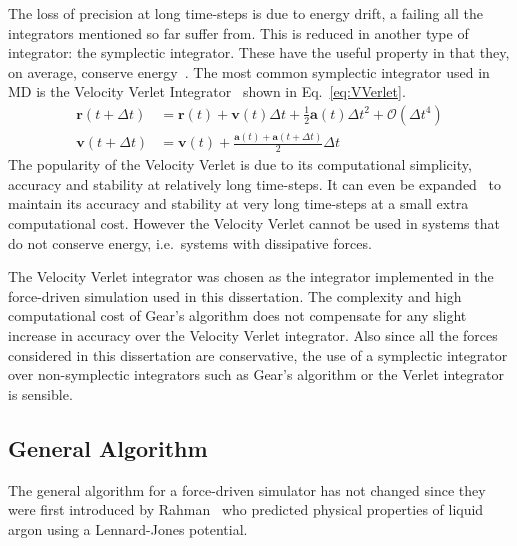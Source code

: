 \documentclass[12pt]{UoAthesis} \usepackage{booktabs}
\begin{document}
The loss of precision at long time-steps is due to energy drift, a
failing all the integrators mentioned so far suffer from.  This is
reduced in another type of integrator: the symplectic integrator.
These have the useful property in that they, on average, conserve
energy~\cite{Hairer2003}. The most common symplectic integrator used
in MD is the Velocity Verlet Integrator~\cite{Swope1982} shown in
Eq.~\eqref{eq:VVerlet}.
\begin{subequations}
\label{eq:VVerlet}
\begin{align}
 \mathbf{r}(t + \Delta t) &= \mathbf{r}(t) + \mathbf{v}(t) \Delta t 
 + \frac{1}{2}\mathbf{a}(t) \Delta t^2 + \mathcal{O}(\Delta t^4)
 \label{eq:VVerletpos} \\
 \mathbf{v}(t+\Delta t) &= \mathbf{v}(t) + \frac{\mathbf{a}(t) 
   + \mathbf{a}(t+\Delta t)}{2}\Delta t
 \label{eq:VVerletVel}
\end{align}
\end{subequations}
The popularity of the Velocity Verlet is due to its computational
simplicity, accuracy and stability at relatively long
time-steps. It can even be expanded~\cite{Khakimov2002} to maintain its
accuracy and stability at very long time-steps at a small extra
computational cost. However the Velocity Verlet cannot be used in
systems that do not conserve energy, i.e.\ systems with dissipative
forces.

The Velocity Verlet integrator was chosen as the integrator
implemented in the force-driven simulation used in this dissertation.
The complexity and high computational cost of Gear's algorithm does
not compensate for any slight increase in accuracy over the Velocity
Verlet integrator.  Also since all the forces considered in this
dissertation are conservative, the use of a symplectic integrator over
non-symplectic integrators such as Gear's algorithm or the Verlet
integrator is sensible.

\subsection{General Algorithm}
The general algorithm for a force-driven simulator has not changed
since they were first introduced by Rahman~\cite{Rahman1964} who
predicted physical properties of liquid argon using a Lennard-Jones
potential.
\end{document}
